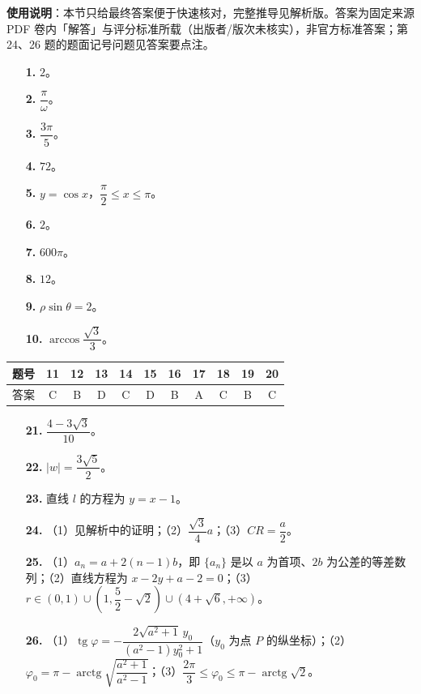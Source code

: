 
\begin{gknotice}
\textbf{使用说明}：本节只给最终答案便于快速核对，完整推导见解析版。答案为固定来源 PDF 卷内「解答」与评分标准所载（出版者/版次未核实），非官方标准答案；第 24、26 题的题面记号问题见答案要点注。
\end{gknotice}

\begin{itemize}[leftmargin=2.6em]
  \item[\textbf{1.}] $2$。
  \item[\textbf{2.}] $\dfrac{\pi}{\omega}$。
  \item[\textbf{3.}] $\dfrac{3\pi}{5}$。
  \item[\textbf{4.}] $72$。
  \item[\textbf{5.}] $y=\cos x$，$\dfrac{\pi}{2}\le x\le\pi$。
  \item[\textbf{6.}] $2$。
  \item[\textbf{7.}] $600\pi$。
  \item[\textbf{8.}] $12$。
  \item[\textbf{9.}] $\rho\sin\theta=2$。
  \item[\textbf{10.}] $\arccos\dfrac{\sqrt3}{3}$。
\end{itemize}

\begin{center}\begin{tabular}{ccccccccccc}
\toprule
题号 & 11 & 12 & 13 & 14 & 15 & 16 & 17 & 18 & 19 & 20 \\
\midrule
答案 & C & B & D & C & D & B & A & C & B & C \\
\bottomrule
\end{tabular}\end{center}

\begin{itemize}[leftmargin=2.6em]
  \item[\textbf{21.}] $\dfrac{4-3\sqrt3}{10}$。
  \item[\textbf{22.}] $|w|=\dfrac{3\sqrt5}{2}$。
  \item[\textbf{23.}] 直线 $l$ 的方程为 $y=x-1$。
  \item[\textbf{24.}] （1）见解析中的证明；（2）$\dfrac{\sqrt3}{4}a$；（3）$CR=\dfrac{a}{2}$。
  \item[\textbf{25.}] （1）$a_n=a+2(n-1)b$，即 $\{a_n\}$ 是以 $a$ 为首项、$2b$ 为公差的等差数列；（2）直线方程为 $x-2y+a-2=0$；（3）$r\in(0,1)\cup\left(1,\dfrac52-\sqrt2\right)\cup(4+\sqrt6,+\infty)$。
  \item[\textbf{26.}] （1）$\operatorname{tg}\varphi=-\dfrac{2\sqrt{a^2+1}\,y_0}{(a^2-1)y_0^2+1}$（$y_0$ 为点 $P$ 的纵坐标）；（2）$\varphi_0=\pi-\operatorname{arctg}\sqrt{\dfrac{a^2+1}{a^2-1}}$；（3）$\dfrac{2\pi}{3}\le\varphi_0\le\pi-\operatorname{arctg}\sqrt2$。
\end{itemize}
